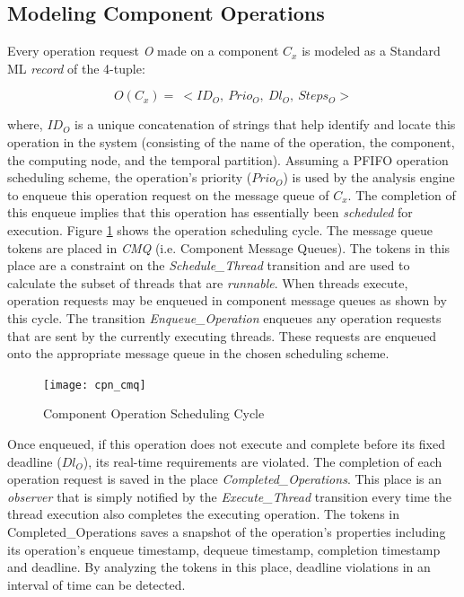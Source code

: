 \subsection{Modeling Component Operations}
\label{sec:Modeling_Component_Operations}
Every operation request \emph{O} made on a component \emph{$C_x$} is modeled as a Standard ML \emph{record} of the 4-tuple:

\begin{equation}
O(C_x) = \ < ID_O, \ Prio_O, \ Dl_O, \  Steps_O >
\end{equation}

where, $ID_O$ is a unique concatenation of strings that help identify and locate this operation in the system (consisting of the name of the operation, the component, the computing node, and the temporal partition). Assuming a PFIFO operation scheduling scheme, the operation's priority ($Prio_O$) is used by the analysis engine to enqueue this operation request on the message queue of $C_x$. The completion of this enqueue implies that this operation has essentially been \emph{scheduled} for execution. Figure \ref{fig:Operation_Scheduling} shows the operation scheduling cycle. The message queue tokens are placed in \emph{CMQ} (i.e. Component Message Queues). The tokens in this place are a constraint on the \emph{Schedule\_Thread} transition and are used to calculate the subset of threads that are \emph{runnable}. When threads execute, operation requests may be enqueued in component message queues as shown by this cycle. The transition  \emph{Enqueue\_Operation} enqueues any operation requests that are sent by the currently executing threads. These requests are enqueued onto the appropriate message queue in the chosen scheduling scheme. 

\begin{figure}[htb]
	\centering
	\texttt{[image: cpn\_cmq]}
	\caption{Component Operation Scheduling Cycle}
	\label{fig:Operation_Scheduling}
\end{figure}

Once enqueued, if this operation does not execute and complete before its fixed deadline ($Dl_O$), its real-time requirements are violated. The completion of each operation request is saved in the place \emph{Completed\_Operations}. This place is an \emph{observer} that is simply notified by the \emph{Execute\_Thread} transition every time the thread execution also completes the executing operation. The tokens in Completed\_Operations saves a snapshot of the operation's properties including its operation's enqueue timestamp, dequeue timestamp, completion timestamp and deadline. By analyzing the tokens in this place, deadline violations in an interval of time can be detected.  

